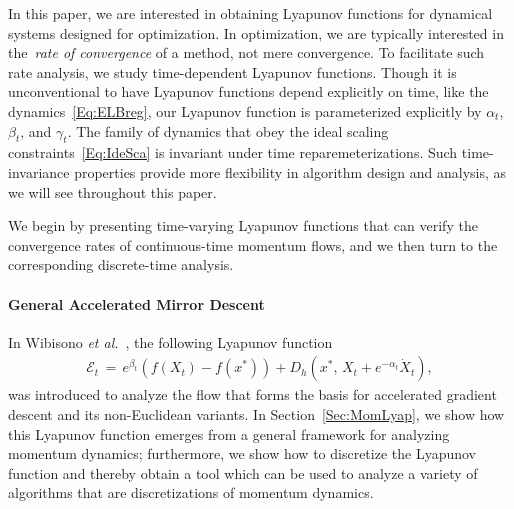 \documentclass[11pt]{article}
\theoremstyle{plain}
\newcommand{\E}{{\mathcal E}}
\begin{document}
In this paper, we are interested in obtaining Lyapunov functions for dynamical systems designed for optimization.  In optimization, we are typically interested in the~\emph{rate of convergence} of a method, not mere convergence.  To facilitate such rate analysis, we study time-dependent Lyapunov functions.  Though it is unconventional to have Lyapunov functions depend explicitly on time, like the dynamics~\eqref{Eq:ELBreg}, our Lyapunov function is parameterized explicitly by $\alpha_t$, $\beta_t$, and $\gamma_t$.  The family of dynamics that obey the ideal scaling constraints~\eqref{Eq:IdeSca} is invariant under time reparemeterizations.  Such time-invariance properties provide more flexibility in algorithm design and analysis, as we will see throughout this paper.

We begin by presenting time-varying Lyapunov functions that can verify the convergence rates of continuous-time momentum flows, and we then turn to the corresponding discrete-time analysis.

\paragraph{General Accelerated Mirror Descent} In Wibisono {\em et al.}~\cite{Acceleration}, the following Lyapunov function 
\begin{align}\label{Eq:E}
\E_t \,=\, e^{\beta_t} (f(X_t)-f(x^*)) + D_h\left(x^*, \, X_t + e^{-\alpha_t} \dot X_t\right),
\end{align}
was introduced to analyze the flow that forms the basis for accelerated gradient descent and its non-Euclidean variants.
In Section~\ref{Sec:MomLyap}, we show how this Lyapunov function emerges from a general framework for analyzing momentum dynamics; furthermore, we show how to discretize the Lyapunov function and thereby obtain a tool which can be used to analyze a variety of algorithms that are discretizations of momentum dynamics.
%
%
%
\end{document}
